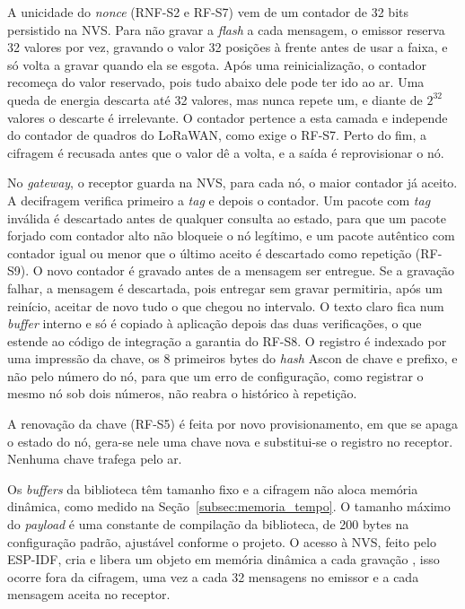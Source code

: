 A unicidade do \textit{nonce} (RNF-S2 e RF-S7) vem de um contador de 32 bits persistido na NVS. Para não gravar a \textit{flash} a cada mensagem, o emissor reserva 32 valores por vez, gravando o valor 32 posições à frente antes de usar a faixa, e só volta a gravar quando ela se esgota. Após uma reinicialização, o contador recomeça do valor reservado, pois tudo abaixo dele pode ter ido ao ar. Uma queda de energia descarta até 32 valores, mas nunca repete um, e diante de $2^{32}$ valores o descarte é irrelevante. O contador pertence a esta camada e independe do contador de quadros do LoRaWAN, como exige o RF-S7. Perto do fim, a cifragem é recusada antes que o valor dê a volta, e a saída é reprovisionar o nó.

No \textit{gateway}, o receptor guarda na NVS, para cada nó, o maior contador já aceito. A decifragem verifica primeiro a \textit{tag} e depois o contador. Um pacote com \textit{tag} inválida é descartado antes de qualquer consulta ao estado, para que um pacote forjado com contador alto não bloqueie o nó legítimo, e um pacote autêntico com contador igual ou menor que o último aceito é descartado como repetição (RF-S9). O novo contador é gravado antes de a mensagem ser entregue. Se a gravação falhar, a mensagem é descartada, pois entregar sem gravar permitiria, após um reinício, aceitar de novo tudo o que chegou no intervalo. O texto claro fica num \textit{buffer} interno e só é copiado à aplicação depois das duas verificações, o que estende ao código de integração a garantia do RF-S8. O registro é indexado por uma impressão da chave, os 8 primeiros bytes do \textit{hash} Ascon de chave e prefixo, e não pelo número do nó, para que um erro de configuração, como registrar o mesmo nó sob dois números, não reabra o histórico à repetição.

A renovação da chave (RF-S5) é feita por novo provisionamento, em que se apaga o estado do nó, gera-se nele uma chave nova e substitui-se o registro no receptor. Nenhuma chave trafega pelo ar.

Os \textit{buffers} da biblioteca têm tamanho fixo e a cifragem não aloca memória dinâmica, como medido na Seção~\ref{subsec:memoria_tempo}. O tamanho máximo do \textit{payload} é uma constante de compilação da biblioteca, de 200 bytes na configuração padrão, ajustável conforme o projeto. O acesso à NVS, feito pelo ESP-IDF, cria e libera um objeto em memória dinâmica a cada gravação \cite{espressif2026idf}, isso ocorre fora da cifragem, uma vez a cada 32 mensagens no emissor e a cada mensagem aceita no receptor.

